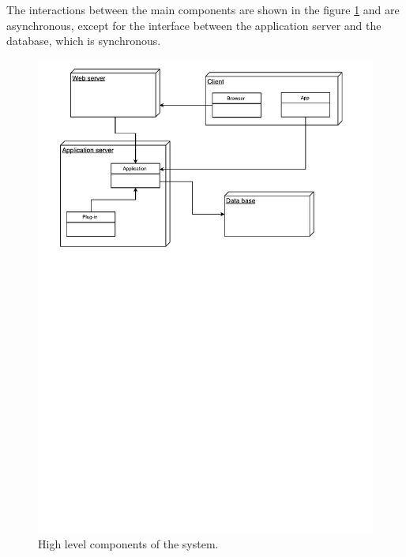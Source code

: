 The interactions between the main components are shown in the figure \ref{fig:high_level_components} and are asynchronous, except for the interface between the application server and the database, which is synchronous.

\begin{figure}[h]
\centering
\includegraphics[width=\textwidth]{diagrams/high_level_components.pdf}
\caption{High level components of the system.}
\label{fig:high_level_components}
\end{figure}
